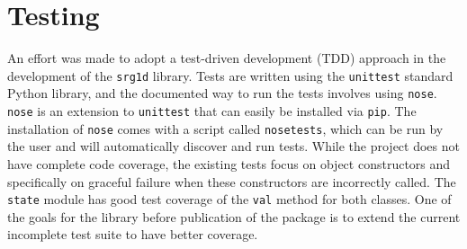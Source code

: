 \section{Testing}

An effort was made to adopt a test-driven development (TDD) approach in the development of the \texttt{srg1d} library. Tests are written using the \texttt{unittest} standard Python library, and the documented way to run the tests involves using \texttt{nose}. \texttt{nose} is an extension to \texttt{unittest} that can easily be installed via \texttt{pip}. The installation of \texttt{nose} comes with a script called \texttt{nosetests}, which can be run by the user and will automatically discover and run tests. While the project does not have complete code coverage, the existing tests focus on object constructors and specifically on graceful failure when these constructors are incorrectly called. The \texttt{state} module has good test coverage of the \texttt{val} method for both classes. One of the goals for the library before publication of the package is to extend the current incomplete test suite to have better coverage.



